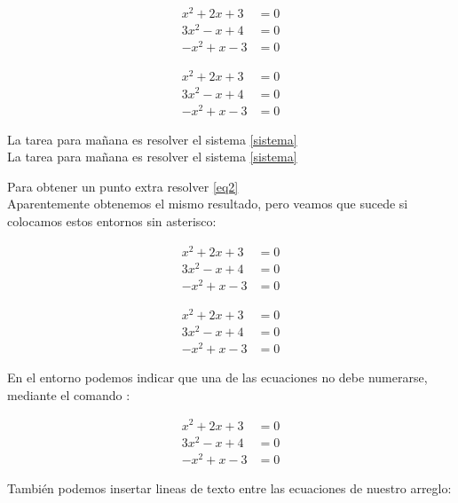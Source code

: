\documentclass[letterpaper,12pt]{book}
\begin{document}
\begin{equation*}
\begin{aligned}
	x^2 + 2x + 3 &= 0 \\
	3x^2 - x + 4 &= 0 \\
	-x^2 + x - 3 &= 0
\end{aligned}
\end{equation*}

\begin{align*}
	x^2 + 2x + 3 &= 0 \\
	3x^2 - x + 4 &= 0 \\
	-x^2 + x - 3 &= 0
\end{align*}

La tarea para mañana es resolver el sistema \ref{sistema}\\
La tarea para mañana es resolver el sistema \eqref{sistema}

Para obtener un punto extra resolver \eqref{eq2}\\

Aparentemente obtenemos el mismo resultado, pero veamos que sucede si colocamos estos entornos sin asterisco:

\begin{equation} \label{sistema}
\begin{aligned}
	x^2 + 2x + 3 &= 0 \\
	3x^2 - x + 4 &= 0 \\
	-x^2 + x - 3 &= 0
\end{aligned}
\end{equation}

\begin{align}
	x^2 + 2x + 3 &= 0 \\
	3x^2 - x + 4 &= 0 \label{eq2}\\
	-x^2 + x - 3 &= 0
\end{align}

En el entorno \verb@align@ podemos indicar que una de las ecuaciones no debe numerarse, mediante el comando \verb@\nonumber@:

\begin{align}
	x^2 + 2x + 3 &= 0 \\
	3x^2 - x + 4 &= 0 \nonumber \\ 
	-x^2 + x - 3 &= 0
\end{align}

También podemos insertar lineas de texto entre las ecuaciones de
nuestro arreglo:
\end{document}
